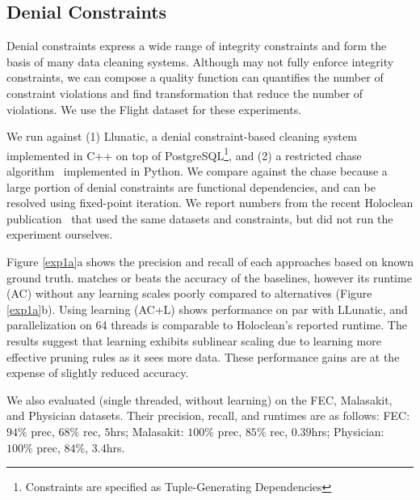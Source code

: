 \subsection*{Denial Constraints}
Denial constraints express a wide range of integrity constraints and form the basis of many data cleaning systems.  Although \sys may not fully enforce integrity constraints, we can compose a quality function can quantifies the number of constraint violations and find transformation that reduce the number of violations.    We use the Flight dataset for these experiments.


 We run against (1) Llunatic, a denial constraint-based cleaning system~\cite{DBLP:conf/sigmod/DallachiesaEEEIOT13} implemented in C++ on top of PostgreSQL\footnote{Constraints are specified as Tuple-Generating Dependencies}, and (2) a restricted chase algorithm~\cite{benedikt2017benchmarking} implemented in Python. We compare against the chase because a large portion of denial constraints are functional dependencies, and can be resolved using fixed-point iteration.  We report numbers from the recent Holoclean publication~\cite{rekatsinas2017holoclean} that used the same datasets and constraints, but did not run the experiment ourselves.

 Figure \ref{exp1a}a shows the precision and recall of each approaches based on known ground truth. \sys matches or beats the accuracy of the baselines, however its runtime (AC) without any learning scales poorly compared to alternatives (Figure~ \ref{exp1a}b).  Using learning (AC+L) shows performance on par with LLunatic, and parallelization on 64 threads is comparable to Holoclean's reported runtime. The results suggest that learning exhibits sublinear scaling due to \sys learning more effective pruning rules as it sees more data.  These performance gains are at the expense of slightly reduced accuracy. 

We also evaluated \sys (single threaded, without learning) on the FEC, Malasakit, and Physician datasets.  Their precision, recall, and runtimes are as follows: 
FEC: $94\%$ prec, $68\%$ rec, $5$hrs; 
Malasakit: $100\%$ prec, $85\%$ rec, $0.39$hrs;
Physician: $100\%$ prec, $84\%$, $3.4$hrs.

